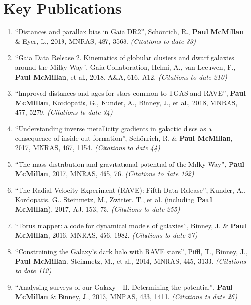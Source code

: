\documentclass{resume}
\begin{document}
\section*{Key Publications}

\begin{enumerate}
\item ``Distances and parallax bias in Gaia DR2'', Sch\"onrich, R., \textbf{Paul McMillan} \& Eyer, L., 2019, MNRAS, 487, 3568. \textit{(Citations to date 33)}

\item ``Gaia Data Release 2. Kinematics of globular clusters and dwarf galaxies around the Milky Way'', Gaia Collaboration, Helmi, A., van Leeuwen, F., \textbf{Paul McMillan}, et al., 2018, A\&A, 616, A12. \textit{(Citations to date 210)}

\item ``Improved distances and ages for stars common to TGAS and RAVE'', \textbf{Paul McMillan}, Kordopatis, G., Kunder, A., Binney, J., et al., 2018, MNRAS, 477, 5279. \textit{(Citations to date 34)}

\item ``Understanding inverse metallicity gradients in galactic discs as a consequence of inside-out formation'', Sch\"onrich, R. \& \textbf{Paul McMillan}, 2017, MNRAS, 467, 1154. \textit{(Citations to date 44)}

\item ``The mass distribution and gravitational potential of the Milky Way'', \textbf{Paul McMillan}, 2017, MNRAS, 465, 76. \textit{(Citations to date 192)}

\item ``The Radial Velocity Experiment (RAVE): Fifth Data Release'', Kunder, A., Kordopatis, G., Steinmetz, M., Zwitter, T., et al. (including \textbf{Paul McMillan}), 2017, AJ, 153, 75. \textit{(Citations to date 255)}

\item ``Torus mapper: a code for dynamical models of galaxies'', Binney, J. \& \textbf{Paul McMillan}, 2016, MNRAS, 456, 1982. \textit{(Citations to date 27)}

\item ``Constraining the Galaxy's dark halo with RAVE stars'', Piffl, T., Binney, J., \textbf{Paul McMillan}, Steinmetz, M., et al., 2014, MNRAS, 445, 3133. \textit{(Citations to date 112)}

\item ``Analysing surveys of our Galaxy - II. Determining the potential'', \textbf{Paul McMillan} \& Binney, J., 2013, MNRAS, 433, 1411. \textit{(Citations to date 26)}


\end{enumerate}
\end{document}
